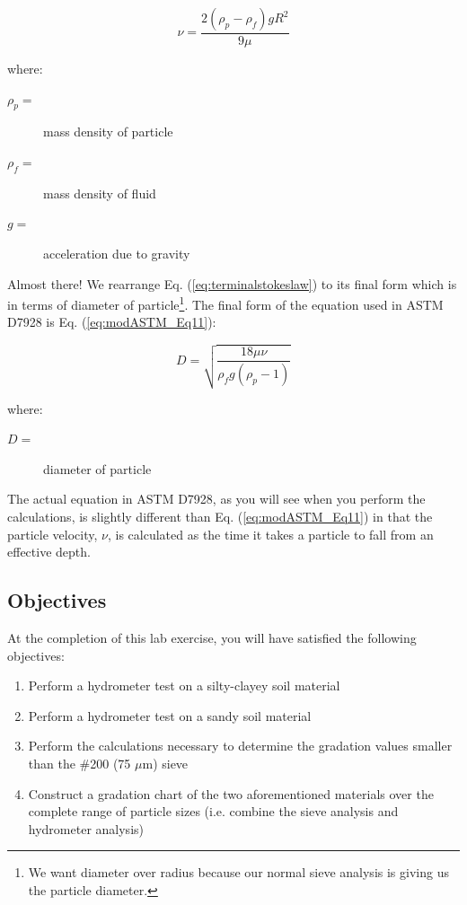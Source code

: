 \documentclass[12pt]{article}
\begin{document}
\begin{equation}
    \nu=\dfrac{2\left(\rho_p-\rho_f\right)gR^2}{9\mu}
    \label{eq:terminalstokeslaw}
\end{equation}

where:
\begin{description}
\item[$\rho_p=$] mass density of particle
\item[$\rho_f=$] mass density of fluid
\item[$g=$] acceleration due to gravity
\end{description}
Almost there! We rearrange Eq. (\ref{eq:terminalstokeslaw}) to its final form which is in terms of diameter of particle\footnote{We want diameter over radius because our normal sieve analysis is giving us the particle diameter.}. The final form of the equation used in ASTM D7928 is Eq. (\ref{eq:modASTM_Eq11}):

\begin{equation}
    D=\sqrt{\dfrac{18\mu\nu}{\rho_f g\left(\rho_p-1\right)}}
    \label{eq:modASTM_Eq11}
\end{equation}

where:
\begin{description}
\item[$D=$] diameter of particle
\end{description}
The actual equation in ASTM D7928, as you will see when you perform the calculations, is slightly different than Eq. (\ref{eq:modASTM_Eq11}) in that the particle velocity, $\nu$, is calculated as the time it takes a particle to fall from an effective depth.

\subsection{Objectives}
At the completion of this lab exercise, you will have satisfied the following objectives:
\begin{enumerate}
    \item Perform a hydrometer test on a silty-clayey soil material
    \item Perform a hydrometer test on a sandy soil material
    \item Perform the calculations necessary to determine the gradation values smaller than the \#200 (75 $\mu$m) sieve
    \item Construct a gradation chart of the two aforementioned materials over the complete range of particle sizes (i.e. combine the sieve analysis and hydrometer analysis)
\end{enumerate}
\end{document}

